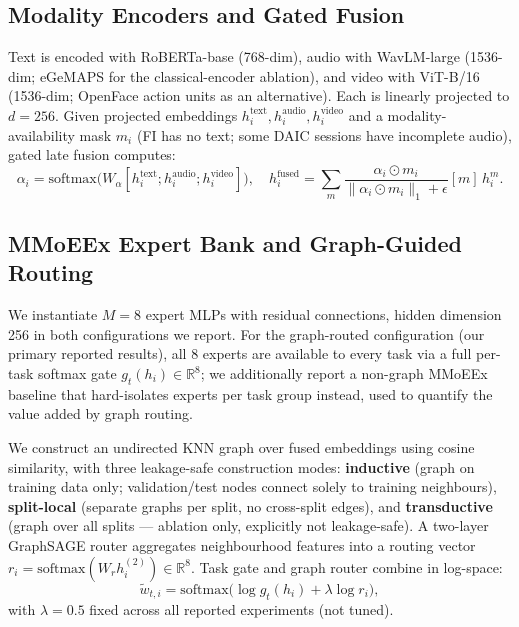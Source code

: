 \documentclass[letterpaper]{article}
\begin{document}
\subsection{Modality Encoders and Gated Fusion}

Text is encoded with RoBERTa-base \citep{liu2019roberta} (768-dim), audio with WavLM-large \citep{chen2022wavlm} (1536-dim; eGeMAPS \citep{eyben2016geneva} for the classical-encoder ablation), and video with ViT-B/16 \citep{dosovitskiy2020image} (1536-dim; OpenFace \citep{baltrusaitis2018openface} action units as an alternative). Each is linearly projected to $d{=}256$. Given projected embeddings $h_i^{\text{text}}, h_i^{\text{audio}}, h_i^{\text{video}}$ and a modality-availability mask $m_i$ (FI has no text; some DAIC sessions have incomplete audio), gated late fusion computes:
\[
\alpha_i = \text{softmax}\big(W_\alpha[h_i^{\text{text}}; h_i^{\text{audio}}; h_i^{\text{video}}]\big), \quad
h_i^{\text{fused}} = \sum_m \frac{\alpha_i \odot m_i}{\lVert \alpha_i \odot m_i \rVert_1 + \epsilon}[m]\, h_i^{m}.
\]

\subsection{MMoEEx Expert Bank and Graph-Guided Routing}

We instantiate $M{=}8$ expert MLPs with residual connections, hidden dimension 256 in both configurations we report. For the graph-routed configuration (our primary reported results), all 8 experts are available to every task via a full per-task softmax gate $g_t(h_i) \in \mathbb{R}^8$; we additionally report a non-graph MMoEEx baseline that hard-isolates experts per task group instead, used to quantify the value added by graph routing.

We construct an undirected KNN graph over fused embeddings using cosine similarity, with three leakage-safe construction modes: \textbf{inductive} (graph on training data only; validation/test nodes connect solely to training neighbours), \textbf{split-local} (separate graphs per split, no cross-split edges), and \textbf{transductive} (graph over all splits — ablation only, explicitly not leakage-safe). A two-layer GraphSAGE router aggregates neighbourhood features into a routing vector $r_i = \text{softmax}(W_r h_i^{(2)}) \in \mathbb{R}^8$. Task gate and graph router combine in log-space:
\[
\tilde w_{t,i} = \text{softmax}\big(\log g_t(h_i) + \lambda \log r_i\big),
\]
with $\lambda{=}0.5$ fixed across all reported experiments (not tuned).
\end{document}
